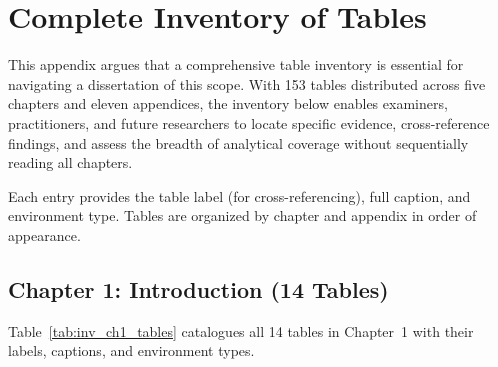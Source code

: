 
\chapter{Complete Inventory of Tables}
\label{app:table_inventory}

This appendix argues that a comprehensive table inventory is essential for navigating a dissertation of this scope. With 153 tables distributed across five chapters and eleven appendices, the inventory below enables examiners, practitioners, and future researchers to locate specific evidence, cross-reference findings, and assess the breadth of analytical coverage without sequentially reading all chapters.

Each entry provides the table label (for cross-referencing), full caption, and environment type. Tables are organized by chapter and appendix in order of appearance.

\tablefontsize %
\sloppy %

\section{Chapter 1: Introduction (14 Tables)}
\label{sec:inv_ch1}

\noindent Table~\ref{tab:inv_ch1_tables} catalogues all 14 tables in Chapter~1 with their labels, captions, and environment types.


